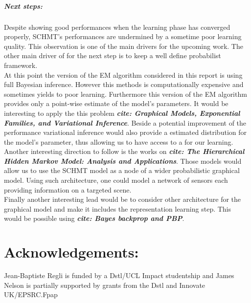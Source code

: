 \documentclass[a4paper,11pt]{report}
\begin{document}
    
    
    
  \paragraph{Next steps:}
		Despite showing good performances when the learning phase has converged properly, SCHMT's performances are undermined by a sometime poor learning quality. This observation is one of the main drivers for the upcoming work. The other main driver of for the next step is to keep a well define probabilist framework.\\
		
		At this point the version of the EM algorithm considered in this report is using full Bayesian inference. However this methods is computationally expensive and sometimes yields to poor learning. Furthermore this version of the EM algorithm provides only a point-wise estimate of the model's parameters. It would be interesting to apply  the this problem \textbf{\textit{cite: Graphical Models, Exponential Families, and Variational Inference}}. Beside a potential improvement of the performance variational inference would also provide a estimated distribution for the model's parameter, thus allowing us to have access to a  for our learning.\\
		
		Another interesting direction to follow is the works on  \textbf{\textit{cite: The Hierarchical Hidden Markov Model: Analysis and Applications}}. Those models would allow us to use the SCHMT model as a node of a wider probabilistic graphical model. Using such architecture, one could model a network of sensors each providing information on a targeted scene.\\
		
		Finally another interesting lead would be to consider other architecture for the graphical model and make it includes the representation learning step. This would be possible using  
     \textbf{\textit{cite: Bayes backprop and PBP}}.
    
\chapter{Acknowledgements:}
	Jean-Baptiste Regli is funded by a Dstl/UCL Impact studentship and James Nelson is partially supported by grants from the Dstl and Innovate UK/EPSRC.Fpap
\end{document}
